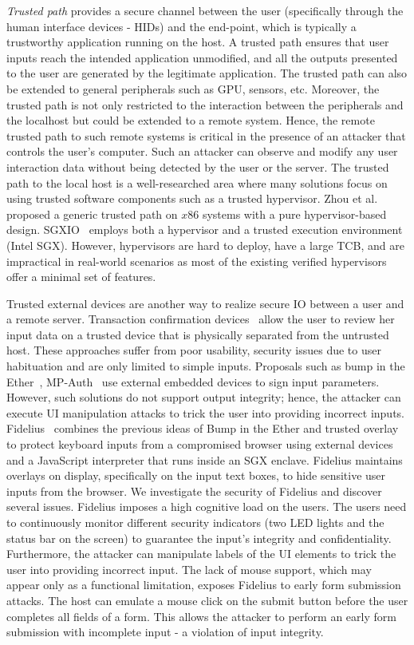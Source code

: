 \emph{Trusted path} provides a secure channel between the user (specifically through the human interface devices - HIDs) and the end-point, which is typically a trustworthy application running on the host. A trusted path ensures that user inputs reach the intended application unmodified, and all the outputs presented to the user are generated by the legitimate application. The trusted path can also be extended to general peripherals such as GPU, sensors, etc. Moreover, the trusted path is not only restricted to the interaction between the peripherals and the localhost but could be extended to a remote system. Hence, the remote trusted path to such remote systems is critical in the presence of an attacker that controls the user's computer. Such an attacker can observe and modify any user interaction data without being detected by the user or the server. The trusted path to the local host is a well-researched area where many solutions focus on using trusted software components such as a trusted hypervisor. Zhou et al.~\cite{zhou2012building} proposed a generic trusted path on $x86$ systems with a pure hypervisor-based design. SGXIO~\cite{weiser2017sgxio} employs both a hypervisor and a trusted execution environment (Intel SGX). However, hypervisors are hard to deploy, have a large TCB, and are impractical in real-world scenarios as most of the existing verified hypervisors offer a minimal set of features.

Trusted external devices are another way to realize secure IO between a user and a remote server. Transaction confirmation devices~\cite{filyanov2011uni,weigold2011secure} allow the user to review her input data on a trusted device that is physically separated from the untrusted host. These approaches suffer from poor usability, security issues due to user habituation and are only limited to simple inputs. Proposals such as bump in the Ether~\cite{McCPerRei2006}, MP-Auth~\cite{mannan2007using} use external embedded devices to sign input parameters. However, such solutions do not support output integrity; hence, the attacker can execute UI manipulation attacks to trick the user into providing incorrect inputs. Fidelius~\cite{Fidelius} combines the previous ideas of Bump in the Ether and trusted overlay to protect keyboard inputs from a compromised browser using external devices and a JavaScript interpreter that runs inside an SGX enclave. Fidelius maintains overlays on display, specifically on the input text boxes, to hide sensitive user inputs from the browser. We investigate the security of Fidelius and discover several issues. Fidelius imposes a high cognitive load on the users. The users need to continuously monitor different security indicators (two LED lights and the status bar on the screen) to guarantee the input's integrity and confidentiality. Furthermore, the attacker can manipulate labels of the UI elements to trick the user into providing incorrect input. 
The lack of mouse support, which may appear only as a functional limitation, exposes Fidelius to early form submission attacks. The host can emulate a mouse click on the submit button before the user completes all fields of a form. This allows the attacker to perform an early form submission with incomplete input - a violation of input integrity. 


